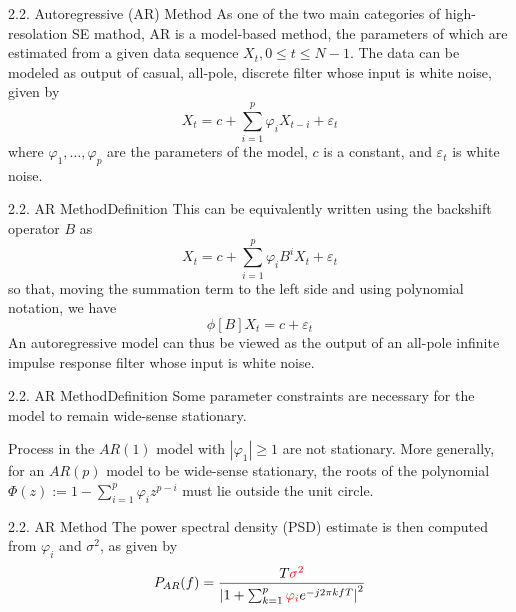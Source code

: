 \documentclass[12pt]{beamer}
\begin{document}
\begin{frame}{2.2. Autoregressive (AR) Method}
  As one of the two main categories of high-resolation SE mathod, AR is a model-based method, the parameters of which are estimated from a given data sequence $X_t,0\leq t\leq N-1$. \pause
  The data can be modeled as output of casual, all-pole, discrete filter whose input is white noise, given by
  \begin{equation}
    X_{t}=c+\sum_{i=1}^{p} \varphi_{i} X_{t-i}+\varepsilon_{t}
  \end{equation}
  where $\varphi_{1}, \ldots, \varphi_{p}$ are the parameters of the model, $c$ is a constant, and $\varepsilon_t$ is white noise.
\end{frame}



\begin{frame}{2.2. AR Method}{Definition}
   This can be equivalently written using the backshift operator $B$ as
  \begin{equation}
    X_{t}=c+\sum_{i=1}^{p} \varphi_{i}B^i X_{t}+\varepsilon_{t}
  \end{equation}\pause
  so that, moving the summation term to the left side and using polynomial notation, we have\begin{equation}
    \phi[B] X_{t}=c+\varepsilon_{t}
  \end{equation}
  An autoregressive model can thus be viewed as the output of an all-pole infinite impulse response filter whose input is white noise.
\end{frame}


\begin{frame}{2.2. AR Method}{Definition}
  Some parameter constraints are necessary for the model to remain wide-sense stationary.\pause
  \begin{example}
    Process in the $AR(1)$ model with $|\varphi_1|\geq 1$ are not stationary. More generally, for an $AR(p)$ model to be wide-sense stationary, the roots of the polynomial $\Phi(z):=1-\sum_{i=1}^{p} \varphi_{i} z^{p-i}$ must lie outside the unit circle.
  \end{example}
\end{frame}

\begin{frame}{2.2. AR Method}
  The power spectral density (PSD) estimate is then computed from $\varphi_i$ and $\sigma^2$\cite{abc}, as given by 
  \begin{equation}
    P_{A R}(f)=\frac{T {\color{red} \sigma^{2}}}{\left|1+\sum_{k=1}^{p} {\color{red} \varphi_i} e^{-j 2 \pi k f T}\right|^{2}}
  \end{equation}
\end{frame}
\end{document}
